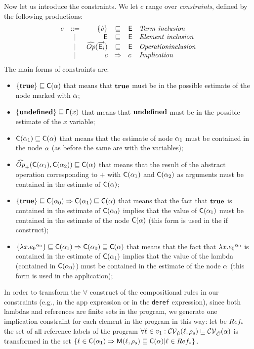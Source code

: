 Now let us introduce the constraints. We let $c$ range over \emph{constraints}, defined by the following productions:
\[
\begin{array}{lcrcll}
c & ::= &\{\vat\} & \sqsubseteq & \El & \mathit{Term\ inclusion}\\
& | & \El & \sqsubseteq & \El & \mathit{Element\ inclusion} \\
& | & \widehat{Op}(\vec{\El_i}) & \sqsubseteq & \El & \mathit{Operation inclusion}\\
& | & c & \Rightarrow & c & \mathit{Implication}\\
\end{array}
\]
The main forms of constraints are:
\begin{itemize}
\item $\{\mathbf{true}\} \sqsubseteq \mathsf{C}(\alpha) $ that means that $\mathbf{true}$ must be in the possible estimate of the node marked with $\alpha$;
\item $\{\mathbf{undefined}\} \sqsubseteq \mathsf{\Gamma}(x) $ that means that $\mathbf{undefined}$ must be in the possible estimate of the $x$ variable;
\item $\mathsf{C}(\alpha_1) \sqsubseteq \mathsf{C}(\alpha) $  that means that the estimate of node $\alpha_1$ must be contained in the node $\alpha$ (as before the same are with the variables);
\item $\widehat{Op}_+(\mathsf{C}(\alpha_1), \mathsf{C}(\alpha_2))\sqsubseteq \mathsf{C}(\alpha)$  that means that the result of the abstract operation corresponding to $+$ with $\mathsf{C}(\alpha_1)$ and $\mathsf{C}(\alpha_2)$ as arguments must be contained in the estimate of $\mathsf{C}(\alpha)$;
\item $\{\mathbf{true}\}\sqsubseteq \mathsf{C}(\alpha_0) \Rightarrow \mathsf{C}(\alpha_1) \sqsubseteq \mathsf{C}(\alpha)$ that means that the fact that $\mathbf{true}$ is contained in the estimate of $\mathsf{C}(\alpha_0)$ implies that the value of $\mathsf{C}(\alpha_1)$ must be contained in the estimate of the node $\mathsf{C}(\alpha)$ (this form is used in the if construct);
\item $\{\lambda x.{e_0}^{\alpha_0}\}\sqsubseteq \mathsf{C}(\alpha_1) \Rightarrow \mathsf{C}(\alpha_0) \sqsubseteq \mathsf{C}(\alpha)$ that means that the fact that $\lambda x.{e_0}^{\alpha_0}$ is contained in the estimate of $\mathsf{C}(\alpha_1)$ implies that the value of the lambda (contained in $\mathsf{C}(\alpha_0)$) must be contained in the estimate of the node $\alpha$ (this form is used in the application);
\end{itemize}

In order to transform the $\forall$ construct of the compositional rules in our constraints (e.g., in the app expression or in the \texttt{deref} expression), since both lambdas and references are finite sets in the program, we generate one implication constraint for each element in the program in this way: let be $Ref_*$ the set of all reference labels of the program $\forall \ell \in v_1: \mathcal{CV}_{\hat{\mu}}(\ell, \rho_s) \sqsubseteq \mathcal{CV}_{\hat{C}}(\alpha)$ is transformed in the set $\{ \ell \in \mathsf{C}(\alpha_1) \Rightarrow \mathsf{M}(\ell, \rho_s) \sqsubseteq \mathsf{C}(\alpha) | \ell \in Ref_* \}$.

